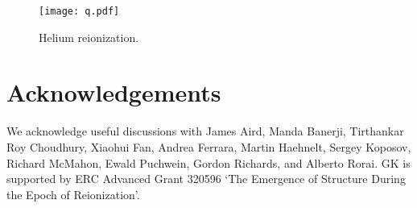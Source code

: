 \documentclass[a4paper,fleqn,usenatbib]{mnras}
\begin{document}
\begin{figure}
  \begin{center}
    \texttt{[image: q.pdf]}
  \end{center}
  \caption{Helium reionization.}
\end{figure}

\section*{Acknowledgements}

We acknowledge useful discussions with James Aird, Manda Banerji,
Tirthankar Roy Choudhury, Xiaohui Fan, Andrea Ferrara, Martin
Haehnelt, Sergey Koposov, Richard McMahon, Ewald Puchwein, Gordon
Richards, and Alberto Rorai.  GK is supported by ERC Advanced Grant
320596 `The Emergence of Structure During the Epoch of Reionization'.




\bsp
\label{lastpage}
\end{document}
